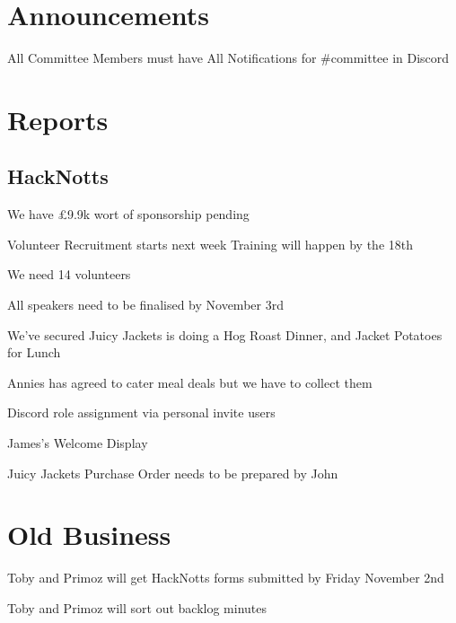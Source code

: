 \documentclass[11pt,hacksoc]{meetingmins}
\begin{document}
\maketitle

\section{Announcements}
\begin{items}
	\item
	All Committee Members must have All Notifications for \#committee in Discord
	
	
\end{items}

\section{Reports}

\subsection{HackNotts}
\begin{hiddensubitems}
	\item
	We have \pounds9.9k wort of sponsorship pending
	
	\item
	Volunteer Recruitment starts next week
		\subitem
		Training will happen by the 18th
		
	\item
	We need 14 volunteers
	
	\item
	All speakers need to be finalised by November 3rd
	
	\item
	We've secured Juicy Jackets is doing a Hog Roast Dinner, and Jacket Potatoes for Lunch
	
	\item
	Annies has agreed to cater meal deals but we have to collect them
	
	\item
	Discord role assignment via personal invite users
	
	\item
	James's Welcome Display
	
	\item
	Juicy Jackets Purchase Order needs to be prepared by John
\end{hiddensubitems}

\section{Old Business}
\begin{items}
	\item
	Toby and Primoz will get HackNotts forms submitted by Friday November 2nd
	
	\item
	Toby and Primoz will sort out backlog minutes
\end{items}
\end{document}
